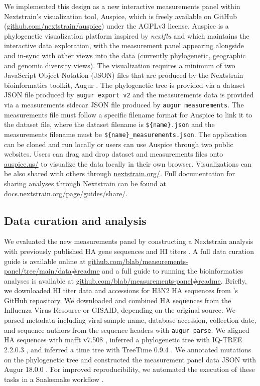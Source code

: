 \documentclass[utf8]{FrontiersinHarvard} %
\begin{document}
We implemented this design as a new interactive measurements panel within Nextstrain's visualization tool, Auspice, which is freely available on GitHub (\href{https://github.com/nextstrain/auspice}{github.com/nextstrain/auspice}) under the AGPLv3 license.
Auspice is a phylogenetic visualization platform inspired by \emph{nextflu} and which maintains the interactive data exploration, with the measurement panel appearing alongside and in-sync with other views into the data (currently phylogenetic, geographic and genomic diversity views).
The visualization requires a minimum of two JavaScript Object Notation (JSON) files that are produced by the Nextstrain bioinformatics toolkit, Augur \citep{Huddleston2021}.
The phylogenetic tree is provided via a dataset JSON file produced by \texttt{augur export v2} and the measurements data is provided via a measurements sidecar JSON file produced by \texttt{augur measurements}.
The measurements file must follow a specific filename format for Auspice to link it to the dataset file, where the dataset filename is \texttt{\$\{name\}.json} and the measurements filename must be \texttt{\$\{name\}\_measurements.json}.
The application can be cloned and run locally or users can use Auspice through two public websites.
Users can drag and drop dataset and measurements files onto \href{https://auspice.us/}{auspice.us/} to visualize the data locally in their own browser.
Visualizations can be also shared with others through \href{https://nextstrain.org/}{nextstrain.org/}.
Full documentation for sharing analyses through Nextstrain can be found at \href{https://docs.nextstrain.org/page/guides/share/}{docs.nextstrain.org/page/guides/share/}.

\subsection{Data curation and analysis}

We evaluated the new measurements panel by constructing a Nextstrain analysis \citep{Hadfield2018} with previously published HA gene sequences and HI titers \citep{Bedford:2014bf}.
A full data curation guide is available online at \href{https://github.com/blab/measurements-panel/tree/main/data#readme}{github.com/blab/measurements-panel/tree/main/data\#readme} and a full guide to running the bioinformatics analyses is available at \href{https://github.com/blab/measurements-panel#readme}{github.com/blab/measurements-panel\#readme}.
Briefly, we downloaded HI titer data and accessions for H3N2 HA sequences from \cite{Bedford:2014bf}'s GitHub repository.
We downloaded and combined HA sequences from the Influenza Virus Resource or GISAID, depending on the original source.
We parsed metadata including viral sample name, database accession, collection date, and sequence authors from the sequence headers with \texttt{augur parse}.
We aligned HA sequences with mafft v7.508 \citep{Katoh2013}, inferred a phylogenetic tree with IQ-TREE 2.2.0.3 \citep{Minh2020}, and inferred a time tree with TreeTime 0.9.4 \citep{Sagulenko2018}.
We annotated mutations on the phylogenetic tree and constructed the measurement panel data JSON with Augur 18.0.0 \citep{Huddleston2021}.
For improved reproducibility, we automated the execution of these tasks in a Snakemake workflow \citep{Molder2021}.
\end{document}
